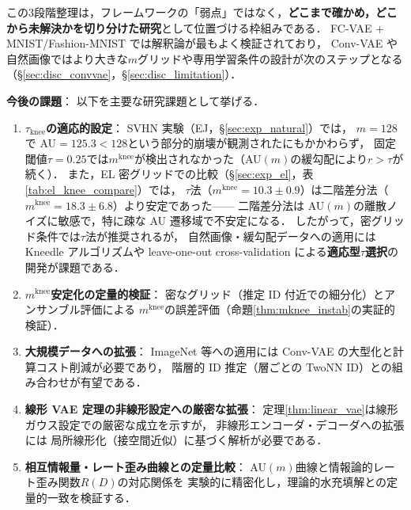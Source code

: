 \documentclass[11pt,a4paper]{jsarticle}
\newcommand{\mknee}{m^{\mathrm{knee}}}
\begin{document}
この3段階整理は，フレームワークの「弱点」ではなく，\textbf{どこまで確かめ，どこから未解決かを切り分けた研究}として位置づける枠組みである．
FC-VAE + MNIST/Fashion-MNIST では解釈論が最もよく検証されており，
Conv-VAE や自然画像ではより大きな$m$グリッドや専用学習条件の設計が次のステップとなる
（§\ref{sec:disc_convvae}，§\ref{sec:disc_limitation}）．

\textbf{今後の課題}：
以下を主要な研究課題として挙げる．

\begin{enumerate}
  \item \textbf{$\tau_{\mathrm{knee}}$の適応的設定}：
        SVHN 実験（EJ，§\ref{sec:exp_natural}）では，
        $m = 128$で AU$= 125.3 < 128$という部分的崩壊が観測されたにもかかわらず，
        固定閾値$\tau = 0.25$では$\mknee$が検出されなかった（AU$(m)$の緩勾配により$r > \tau$が続く）．
        また，EL 密グリッドでの比較（§\ref{sec:exp_el}，表\ref{tab:el_knee_compare}）では，
        $\tau$法（$\mknee=10.3\pm0.9$）は二階差分法（$\mknee=18.3\pm6.8$）より安定であった——
        二階差分法は AU$(m)$の離散ノイズに敏感で，特に疎な AU 遷移域で不安定になる．
        したがって，密グリッド条件では$\tau$法が推奨されるが，
        自然画像・緩勾配データへの適用には Kneedle アルゴリズムや
        leave-one-out cross-validation による\textbf{適応型$\tau$選択}の開発が課題である．
  \item \textbf{$\mknee$安定化の定量的検証}：
        密なグリッド（推定 ID 付近での細分化）とアンサンブル評価による
        $\mknee$の誤差評価（命題\ref{thm:mknee_instab}の実証的検証）．
  \item \textbf{大規模データへの拡張}：
        ImageNet 等への適用には Conv-VAE の大型化と計算コスト削減が必要であり，
        階層的 ID 推定（層ごとの TwoNN ID）との組み合わせが有望である．
  \item \textbf{線形 VAE 定理の非線形設定への厳密な拡張}：
        定理\ref{thm:linear_vae}は線形ガウス設定での厳密な成立を示すが，
        非線形エンコーダ・デコーダへの拡張には
        局所線形化（接空間近似）に基づく解析が必要である．
  \item \textbf{相互情報量・レート歪み曲線との定量比較}：
        AU$(m)$曲線と情報論的レート歪み関数$R(D)$の対応関係を
        実験的に精密化し，理論的水充填解との定量的一致を検証する．
\end{enumerate}
\end{document}
